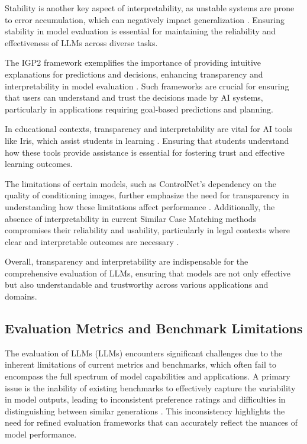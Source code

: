 Stability is another key aspect of interpretability, as unstable systems are prone to error accumulation, which can negatively impact generalization \cite{das2024exploringlearnabilitymemoryaugmentedrecurrent}. Ensuring stability in model evaluation is essential for maintaining the reliability and effectiveness of LLMs across diverse tasks.



The IGP2 framework exemplifies the importance of providing intuitive explanations for predictions and decisions, enhancing transparency and interpretability in model evaluation \cite{albrecht2021interpretablegoalbasedpredictionplanning}. Such frameworks are crucial for ensuring that users can understand and trust the decisions made by AI systems, particularly in applications requiring goal-based predictions and planning.



In educational contexts, transparency and interpretability are vital for AI tools like Iris, which assist students in learning \cite{bassner2024irisaidrivenvirtualtutor}. Ensuring that students understand how these tools provide assistance is essential for fostering trust and effective learning outcomes.



The limitations of certain models, such as ControlNet's dependency on the quality of conditioning images, further emphasize the need for transparency in understanding how these limitations affect performance \cite{zhang2023adding}. Additionally, the absence of interpretability in current Similar Case Matching methods compromises their reliability and usability, particularly in legal contexts where clear and interpretable outcomes are necessary \cite{lin2023interpretabilityframeworksimilarcase}.



Overall, transparency and interpretability are indispensable for the comprehensive evaluation of LLMs, ensuring that models are not only effective but also understandable and trustworthy across various applications and domains.



\subsection{Evaluation Metrics and Benchmark Limitations} \label{subsec:Evaluation Metrics and Benchmark Limitations}

The evaluation of LLMs (LLMs) encounters significant challenges due to the inherent limitations of current metrics and benchmarks, which often fail to encompass the full spectrum of model capabilities and applications. A primary issue is the inability of existing benchmarks to effectively capture the variability in model outputs, leading to inconsistent preference ratings and difficulties in distinguishing between similar generations \cite{ghosh2024comparedespairreliablepreference}. This inconsistency highlights the need for refined evaluation frameworks that can accurately reflect the nuances of model performance.



